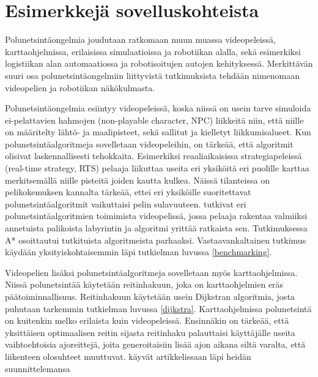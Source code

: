 \section{Esimerkkejä sovelluskohteista}\label{eSuovelluskohteista}
Polunetsintäongelmia joudutaan ratkomaan muun muassa videopeleissä, 
karttaohjelmissa, erilaisissa simulaatioissa ja robotiikan alalla,
\cite{ACMHindawi} sekä esimerkiksi logistiikan alan automaatiossa ja 
robotisoitujen autojen kehityksessä.\cite{arXivMAPF} Merkittävän suuri 
osa polunetsintäongelmiin liittyvistä tutkimuksista tehdään nimenomaan 
\\videopelien\cite{MathewAndMalathy}\cite{ACMHindawi}\cite{mazeGameTrilogi}
ja robotiikan\cite{ACMHindawi}\cite{DelaunayVoronoiAStar} näkökulmasta.\par
	Polunetsintäongelmia esiintyy videopeleissä, koska niissä on usein 
tarve simuloida ei-pelattavien hahmojen (non-playable character, NPC) 
liikkeitä niin, että niille on määritelty lähtö- ja maalipisteet, sekä 
sallitut ja kielletyt liikkumisalueet. Kun polunetsintäalgoritmeja 
sovelletaan videopeleihin, on tärkeää, että algoritmit olisivat 
laskennallisesti tehokkaita. Esimerkiksi reaaliaikaisissa strategiapeleissä 
(real-time strategy, RTS) pelaaja liikuttaa useita eri yksiköitä eri puolille 
karttaa merkitsemällä niille pisteitä joiden kautta kulkea. Näissä 
tilanteissa on pelikokemuksen kannalta tärkeää, ettei eri yksiköille 
suoritettavat polunetsintäalgoritmit vaikuttaisi pelin 
sulavuuteen.\cite{MathewAndMalathy} \textcite{mazeGameTrilogi} tutkivat 
eri polunetsintäalgoritmien toimimista videopelissä, jossa pelaaja rakentaa 
valmiiksi annetuista palikoista labyrintin ja algoritmi yrittää ratkaista 
sen. Tutkimuksessa A* osoittautui tutkituista algoritmeista parhaaksi. 
Vastaavankaltainen tutkimus käydään yksityiskohtaisemmin läpi tutkielman 
luvussa \ref{benchmarking}. \par
	Videopelien lisäksi polunetsintäalgoritmeja sovelletaan myös 
karttaohjelmissa. Niissä polunetsintää käytetään reitinhakuun, joka on 
karttaohjelmien eräs päätoiminnallisuus. Reitinhakuun käytetään usein 
Dijkstran algoritmia,\cite{IOPDijkstra} josta puhutaan tarkemmin tutkielman 
luvussa \ref{dijkstra}. Karttaohjelmissa polunetsintä on kuitenkin melko 
erilaista kuin videopeleissä. Ensinnäkin on tärkeää, että yksittäisen 
optimaalisen reitin sijasta reitinhaku palauttaisi käyttäjälle useita 
vaihtoehtoisia ajoreittejä, joita generoitaisiin lisää ajon aikana siltä 
varalta, että liikenteen olosuhteet muuttuvat.\cite{Lanelet2} 
\textcite{Lanelet2} käyvät artikkelissaan läpi heidän suunnittelemansa 
